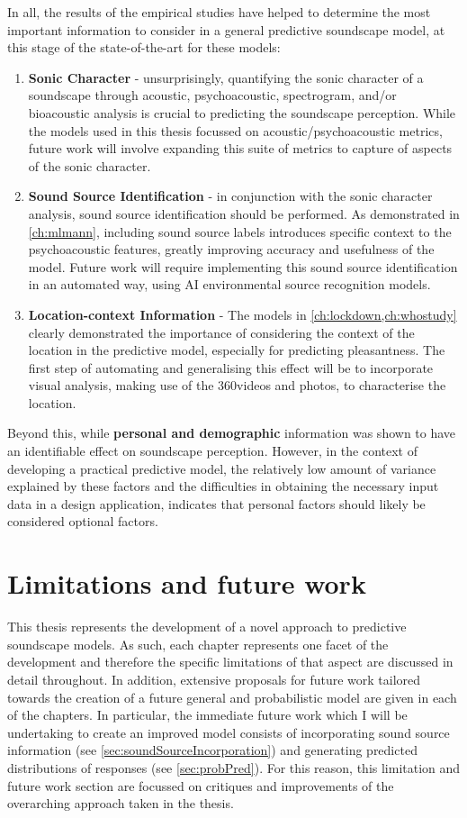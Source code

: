 In all, the results of the empirical studies have helped to determine the most important information to consider in a general predictive soundscape model, at this stage of the state-of-the-art for these models:

\begin{enumerate}
  \item \textbf{Sonic Character} - unsurprisingly, quantifying the sonic character of a soundscape through acoustic, psychoacoustic, spectrogram, and/or bioacoustic analysis is crucial to predicting the soundscape perception. While the models used in this thesis focussed on acoustic/psychoacoustic metrics, future work will involve expanding this suite of metrics to capture of aspects of the sonic character.
  \item \textbf{Sound Source Identification} - in conjunction with the sonic character analysis, sound source identification should be performed. As demonstrated in \cref{ch:mlmann}, including sound source labels introduces specific context to the psychoacoustic features, greatly improving accuracy and usefulness of the model. Future work will require implementing this sound source identification in an automated way, using AI environmental source recognition models.
  \item \textbf{Location-context Information} - The models in \cref{ch:lockdown,ch:whostudy} clearly demonstrated the importance of considering the context of the location in the predictive model, especially for predicting pleasantness. The first step of automating and generalising this effect will be to incorporate visual analysis, making use of the 360\degree videos and photos, to characterise the location.
\end{enumerate}

Beyond this, while \textbf{personal and demographic} information was shown to have an identifiable effect on soundscape perception. However, in the context of developing a practical predictive model, the relatively low amount of variance explained by these factors and the difficulties in obtaining the necessary input data in a design application, indicates that personal factors should likely be considered optional factors.

\section{Limitations and future work}

This thesis represents the development of a novel approach to predictive soundscape models. As such, each chapter represents one facet of the development and therefore the specific limitations of that aspect are discussed in detail throughout. In addition, extensive proposals for future work tailored towards the creation of a future general and probabilistic model are given in each of the chapters. In particular, the immediate future work which I will be undertaking to create an improved model consists of incorporating sound source information (see \cref{sec:soundSourceIncorporation}) and generating predicted distributions of responses (see \cref{sec:probPred}). For this reason, this limitation and future work section are focussed on critiques and improvements of the overarching approach taken in the thesis.

